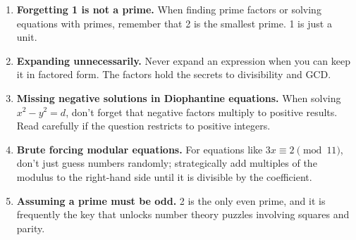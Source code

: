 \documentclass[11pt,a4paper]{article}
\begin{document}
\begin{enumerate}[leftmargin=2em, itemsep=4pt]
  \item \textbf{Forgetting 1 is not a prime.}
        When finding prime factors or solving equations with primes, remember that 2 is the smallest prime. 1 is just a unit. 
  \item \textbf{Expanding unnecessarily.}
        Never expand an expression when you can keep it in factored form. The factors hold the secrets to divisibility and GCD. 
  \item \textbf{Missing negative solutions in Diophantine equations.}
        When solving $x^2 - y^2 = d$, don't forget that negative factors multiply to positive results. Read carefully if the question restricts to positive integers. 
  \item \textbf{Brute forcing modular equations.}
        For equations like $3x \equiv 2 \pmod{11}$, don't just guess numbers randomly; strategically add multiples of the modulus to the right-hand side until it is divisible by the coefficient. 
  \item \textbf{Assuming a prime must be odd.}
        2 is the only even prime, and it is frequently the key that unlocks number theory puzzles involving squares and parity. 
\end{enumerate}

\end{document}
